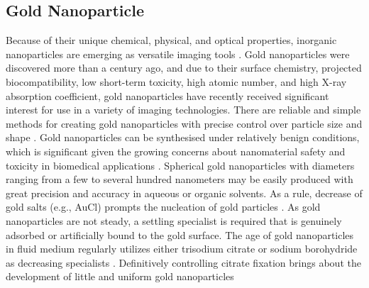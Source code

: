 \documentclass[12pt]{article}
\begin{document}
\subsection*{Gold Nanoparticle} 
Because of their unique chemical, physical, and optical properties, inorganic nanoparticles are emerging as versatile imaging tools . Gold nanoparticles were discovered more than a century ago, and due to their surface chemistry, projected biocompatibility, low short-term toxicity, high atomic number, and high X-ray absorption coefficient, gold nanoparticles have recently received significant interest for use in a variety of imaging technologies. There are reliable and simple methods for creating gold nanoparticles with precise control over particle size and shape . Gold nanoparticles can be synthesised under relatively benign conditions, which is significant given the growing concerns about nanomaterial safety and toxicity in biomedical applications .
 Spherical gold nanoparticles with diameters ranging from a few to several hundred nanometers may be easily produced with great precision and accuracy in aqueous or organic solvents. As a rule, decrease of gold salts (e.g., AuCl) prompts the nucleation of gold particles . As gold nanoparticles are not steady, a settling specialist is required that is genuinely adsorbed or artificially bound to the gold surface. The age of gold nanoparticles in fluid medium regularly utilizes either trisodium citrate or sodium borohydride as decreasing specialists . Definitively controlling citrate fixation brings about the development of little and uniform gold nanoparticles
\end{document}

